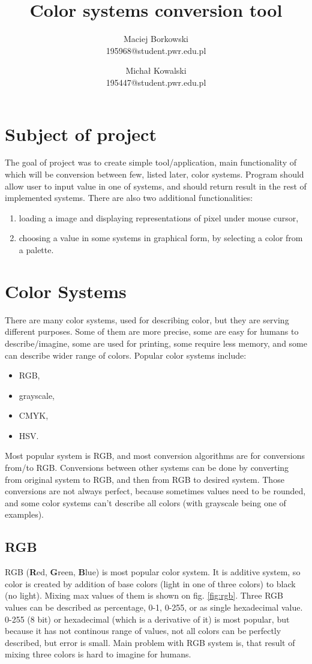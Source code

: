 \documentclass[titlepage]{article}
\title{Color systems conversion tool}
\author{Maciej Borkowski\\ 195968@student.pwr.edu.pl \and Michał Kowalski \\ 195447@student.pwr.edu.pl}
\date{}
\begin{document}
\maketitle

\section{Subject of project}
The goal of project was to create simple tool/application, main functionality of
which will be conversion between few, listed later, color systems. Program
should allow user to input value in one of systems, and should return result in
the rest of implemented systems. There are also two additional functionalities:
\begin{enumerate}
  \item loading a image and displaying representations of pixel under mouse
  cursor,
  \item choosing a value in some systems in graphical form, by selecting a color
  from a palette.
\end{enumerate}


\section{Color Systems}
There are many color systems, used for describing color, but they are serving
different purposes. Some of them are more precise, some are easy for humans to
describe/imagine, some are used for printing, some require less memory, and some
can describe wider range of colors.
Popular color systems include:
\begin{itemize}
  \item RGB,
  \item grayscale,
  \item CMYK,
  \item HSV.
\end{itemize}
Most popular system is RGB, and most conversion algorithms are for conversions
from/to RGB. Conversions between other systems can be done by converting from
original system to RGB, and then from RGB to desired system. Those conversions
are not always perfect, because sometimes values need to be rounded, and some
color systems can't describe all colors (with grayscale being one of examples).

\subsection{RGB}
RGB (\textbf{R}ed, \textbf{G}reen, \textbf{B}lue) is most popular color system.
It is additive system, so color is created by addition of base colors (light in
one of three colors) to black (no light). Mixing max values of them is shown on
fig. \ref{fig:rgb}. Three RGB values can be described as percentage, 0-1, 0-255,
or as single hexadecimal value. 0-255 (8 bit) or hexadecimal (which is a
derivative of it) is most popular, but because it has not continous range of
values, not all colors can be perfectly described, but error is small. Main
problem with RGB system is, that result of mixing three colors is hard to
imagine for humans.
\end{document}
